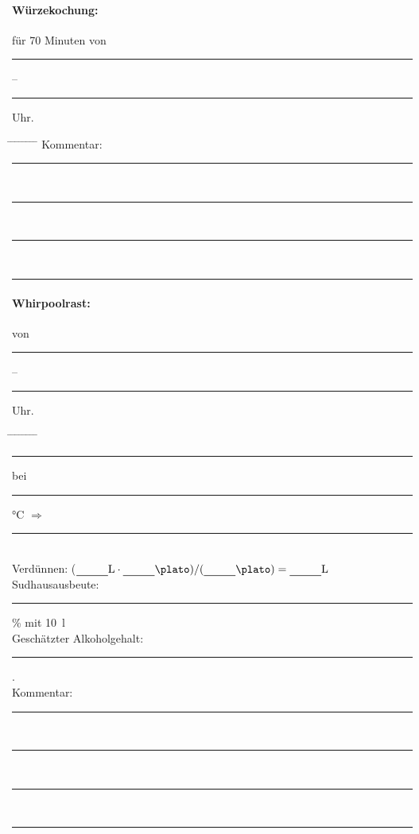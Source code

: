\documentclass[12pt,oneside,a4paper]{scrartcl}
\newcommand{\Zeitluecke}{\rule[-0.1cm]{1.8cm}{0.5pt}}
\begin{document}
{\paragraph{Würzekochung:} für 70 Minuten von \Zeitluecke -- \Zeitluecke Uhr.
	\begin{tabbing}
		\hspace{1cm} \= \hspace{1cm} \= \hspace{1cm} \= \hspace{1cm} \= \hspace{1cm} \= \hspace{1cm} \= \hspace{1cm} \= \hspace{1cm} \= \kill
		\> Kommentar: \>\>\> \rule[-0.1cm]{13cm}{0.5pt}\\
			\> \>  \rule[-0.1cm]{15.3cm}{0.5pt}\\
			\> \>  \rule[-0.1cm]{15.3cm}{0.5pt}\\
			\> \>  \rule[-0.1cm]{15.3cm}{0.5pt}		
	\end{tabbing}
\paragraph{Whirpoolrast:} von \Zeitluecke -- \Zeitluecke Uhr.
	\begin{tabbing}
		\hspace{1cm} \= \hspace{1cm} \= \hspace{1cm} \= \hspace{1cm} \= \hspace{1cm} \= \hspace{1cm} \= \hspace{1cm} \= \hspace{1cm} \= \kill
		\> \> \> \rule[-0.1cm]{0.6cm}{0.5pt}\si{\plato} \> bei \> \rule[-0.1cm]{0.6cm}{0.5pt}\si{\degreeCelsius} \> $\Rightarrow$ \> \rule[-0.1cm]{0.6cm}{0.5pt}\si{\plato}\\
		\> \> Verdünnen: \> \> \> \> \> ($\rule[-0.1cm]{1cm}{0.5pt}\si{\litre} \cdot \rule[-0.1cm]{1cm}{0.5pt}\si{\plato})/(\rule[-0.1cm]{1cm}{0.5pt}\si{\plato})= \rule[-0.1cm]{1cm}{0.5pt}\si{\litre}$\\
		\> \> Sudhausausbeute: \> \> \> \> \> \rule[-0.1cm]{1cm}{0.5pt}\si{\percent} mit \SI{10}{\litre}\\
		\> \> Geschätzter Alkoholgehalt: \> \> \> \> \> \rule[-0.1cm]{1cm}{0.5pt}\si{\pervol}.\\
				\> Kommentar: \>\>\> \rule[-0.1cm]{13cm}{0.5pt}\\
		\> \>  \rule[-0.1cm]{15.3cm}{0.5pt}\\
		\> \>  \rule[-0.1cm]{15.3cm}{0.5pt}\\
		\> \>  \rule[-0.1cm]{15.3cm}{0.5pt}
	\end{tabbing}
%
}
\end{document}
